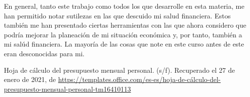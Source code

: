 \documentclass[11pt]{article}
\begin{document}
	\par En general, tanto este trabajo como todos los que desarrolle en esta materia, me han permitido notar sutilezas en las que descuido mi salud financiera. Estos también me han presentado ciertas herramientas con las que ahora considero que podría mejorar la planeación de mi situación económica y, por tanto, también a mi salúd financiera. La mayoría de las cosas que note en este curso antes de este eran desconocidas para mi.

	\begin{thebibliography}{X}
	
		 Hoja de cálculo del presupuesto mensual personal. (s/f). Recuperado el 27 de enero de 2021, de \url{https://templates.office.com/es-es/hoja-de-cálculo-del-presupuesto-mensual-personal-tm16410113}
		
	\end{thebibliography}
\end{document}
